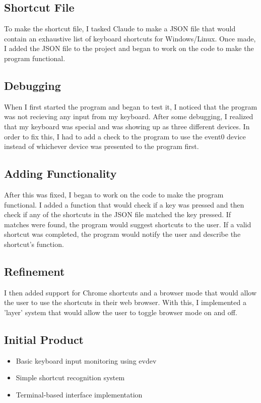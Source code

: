 \documentclass{article}
\begin{document}
\subsection{Shortcut File}
To make the shortcut file, I tasked Claude to make a JSON file that would contain an exhaustive list of keyboard shortcuts for Windows/Linux. Once made, I added the JSON file to the project and began to work on the code to make the program functional.

\subsection{Debugging}
When I first started the program and began to test it, I noticed that the program was not recieving any input from my keyboard. After some debugging, I realized that my keyboard was special and was showing up as three different devices. In order to fix this, I had to add a check to the program to use the event0 device instead of whichever device was presented to the program first.

\subsection{Adding Functionality}
After this was fixed, I began to work on the code to make the program functional. I added a function that would check if a key was pressed and then check if any of the shortcuts in the JSON file matched the key pressed. If matches were found, the program would suggest shortcuts to the user. If a valid shortcut was completed, the program would notify the user and describe the shortcut's function.

\subsection{Refinement}
I then added support for Chrome shortcuts and a browser mode that would allow the user to use the shortcuts in their web browser. With this, I implemented a 'layer' system that would allow the user to toggle browser mode on and off.


\subsection{Initial Product}
\begin{itemize}
    \item Basic keyboard input monitoring using evdev
    \item Simple shortcut recognition system
    \item Terminal-based interface implementation
\end{itemize}
\end{document}
